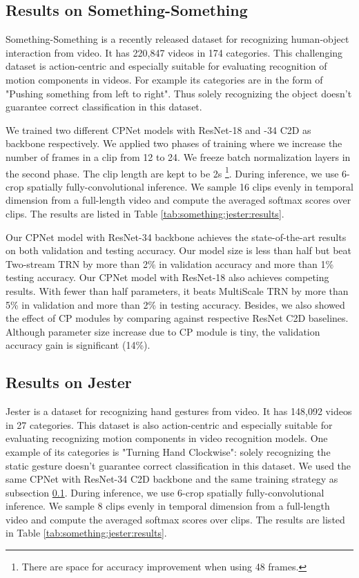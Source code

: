 \documentclass[10pt,twocolumn,letterpaper]{article}
\begin{document}
\subsection{Results on Something-Something}
\label{sec:something:something}

Something-Something \cite{Something:Something} is a recently released dataset for recognizing human-object interaction from video. It has 220,847 videos in 174 categories. This challenging dataset is action-centric and especially suitable for evaluating recognition of motion components in videos. For example its categories are in the form of "Pushing something from left to right". Thus solely recognizing the object doesn't guarantee correct classification in this dataset. 

We trained two different CPNet models with ResNet-18 and -34 C2D as backbone respectively. We applied two phases of training where we increase the number of frames in a clip from 12 to 24. We freeze batch normalization layers in the second phase. The clip length are kept to be 2s \footnote{There are space for accuracy improvement when using 48 frames.}. During inference, we use 6-crop spatially fully-convolutional inference. We sample 16 clips evenly in temporal dimension from a full-length video and compute the averaged softmax scores over  clips. The results are listed in Table \ref{tab:something:jester:results}.

Our CPNet model with ResNet-34 backbone achieves the state-of-the-art results on both validation and testing accuracy. Our model size is less than half but beat Two-stream TRN \cite{TRN} by more than 2\% in  validation accuracy and more than 1\% testing accuracy. Our CPNet model with ResNet-18 also achieves competing results. With fewer than half parameters, it beats MultiScale TRN \cite{TRN} by more than 5\% in validation and more than 2\% in testing accuracy.
Besides, we also showed the effect of CP modules by comparing against respective ResNet C2D baselines. Although parameter size increase due to CP module is tiny, the validation accuracy gain is significant (14\%).


\subsection{Results on Jester}

Jester \cite{Jester} is a dataset for recognizing hand gestures from video. It has 148,092 videos in 27 categories. This dataset is also action-centric and especially suitable for evaluating recognizing motion components in video recognition models. One example of its categories is "Turning Hand Clockwise": solely recognizing the static gesture doesn't guarantee correct classification in this dataset. 
We used the same CPNet with ResNet-34 C2D backbone and the same training strategy as subsection \ref{sec:something:something}. During inference, we use 6-crop spatially fully-convolutional inference. We sample 8 clips evenly in temporal dimension from a full-length video and compute the averaged softmax scores over  clips. The results are listed in Table \ref{tab:something:jester:results}.
\end{document}
